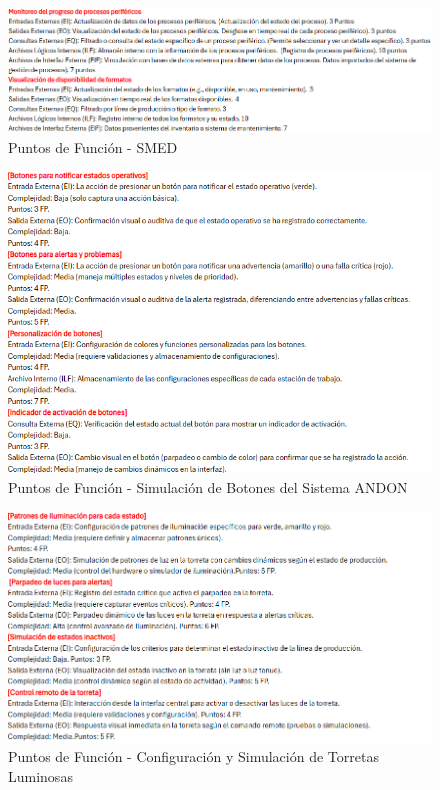 \documentclass[12pt,letterpaper,spanish, xcolor=table]{report}
\numberwithin{figure}{subsection}
\begin{document}
	\begin{figure}[H]
		\centering
		\includegraphics[width=1.0\textwidth]
		{Imagenes/PathAyuda/FpsSMED.png}
		\caption{Puntos de Función - SMED
		}\label{a2}
	\end{figure}
	
	\begin{figure}[H]
		\centering
		\includegraphics[width=1.0\textwidth]
		{Imagenes/PathAyuda/FpsBotonesANDON.png}
		\caption{Puntos de Función - Simulación de Botones del Sistema ANDON 
		}\label{a2}
	\end{figure}

	
	\begin{figure}[H]
		\centering
		\includegraphics[width=1.0\textwidth]
		{Imagenes/PathAyuda/FpsTorretasLuminosas.png}
		\caption{Puntos de Función - Configuración y Simulación de Torretas Luminosas  
		}\label{a2}
	\end{figure}
	
\end{document}
